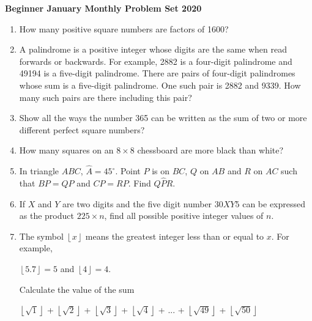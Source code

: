 \documentclass{article}
\begin{document}
	
\begin{center}
	\textbf{\Large Beginner January Monthly Problem Set 2020}
\end{center}

\begin{enumerate}

\item %
How many positive square numbers are factors of 1600?
\vspace{3mm}

\item %
A palindrome is a positive integer whose digits are the same when read forwards or backwards.
For example, 2882 is a four-digit palindrome and 49194 is a five-digit palindrome. There are
pairs of four-digit palindromes whose sum is a five-digit palindrome. One such pair is 2882
and 9339. How many such pairs are there including this pair?
\vspace{3mm}

\item %
Show all the ways the number 365 can be written as the sum of two or more different perfect
square numbers?
\vspace{3mm}

\item %
How many squares on an $8 \times 8$ chessboard are more black than white?

\item %
In triangle $ABC$, $\widehat{A} = 45^{\circ}$. Point $P$ is on $BC$, $Q$ on $AB$ and $R$ on $AC$ such that $BP = QP$ and $CP = RP$. Find $Q \widehat{P} R$.
\vspace{3mm}

\item %
If $X$ and $Y$ are two digits and the five digit number $30XY5$ can be expressed as the product $225 \times n$, find all possible positive integer values of $n$.
\vspace{3mm}

\item %
The symbol $\left \lfloor{x}\right \rfloor$ means the greatest integer less than or equal to $x$. For example, 
\begin{center}
	$\left \lfloor{5.7}\right \rfloor = 5$ and $\left \lfloor{4}\right \rfloor = 4$.
\end{center} 
Calculate the value of the sum
\begin{center}
	$\left \lfloor{\sqrt{1}}\right \rfloor$ + $\left \lfloor{\sqrt{2}}\right \rfloor$ + $\left \lfloor{\sqrt{3}}\right \rfloor$ + $\left \lfloor{\sqrt{4}}\right \rfloor$ + ... + $\left \lfloor{\sqrt{49}}\right \rfloor$ + $\left \lfloor{\sqrt{50}}\right \rfloor$
\end{center}
\vspace{3mm}


\end{enumerate}
\end{document}
